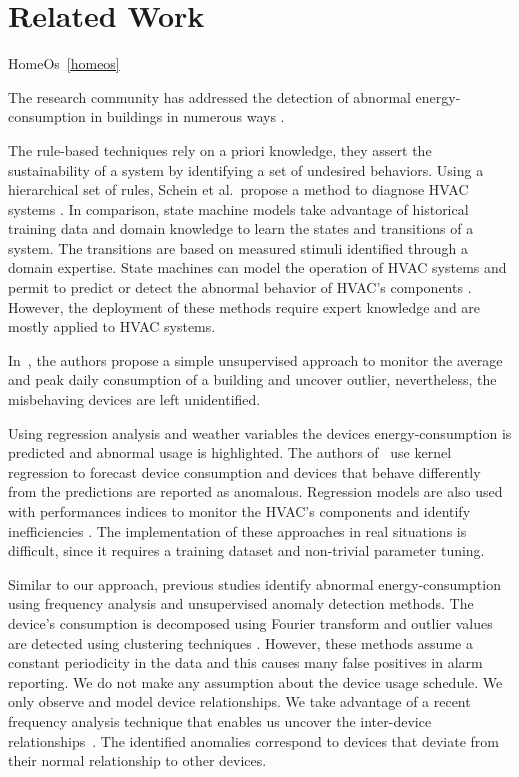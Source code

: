 \section{Related Work}
HomeOs~\ref{homeos}

The research community has addressed the detection of abnormal energy-consumption in buildings in numerous ways \cite{katipamula:1review2005,katipamula:2review2005}.
% 

The rule-based techniques rely on a priori knowledge, they assert the sustainability of a system by identifying a set of undesired behaviors.
Using a hierarchical set of rules, Schein et al.\ propose a method to diagnose HVAC systems \cite{schein:hvacr2006}.
In comparison, state machine models take advantage of historical training data and domain knowledge to learn the states and transitions of a system.
The transitions are based on measured stimuli identified through a domain expertise.
State machines can model the operation of HVAC systems \cite{patnaik:toist2011} and permit to predict or detect the abnormal behavior of HVAC's components \cite{bellala:buildsys2012}.
However, the deployment of these methods require expert knowledge and are mostly applied to HVAC systems.

In~\cite{seem:energybldg2007}, the authors propose a simple unsupervised approach to monitor the average and peak daily consumption of a building and uncover outlier, nevertheless, the misbehaving devices are left unidentified.

Using regression analysis and weather variables the devices energy-consumption is predicted and abnormal usage is highlighted.
The authors of~\cite{brown:buildperf2012} use kernel regression to forecast device consumption and devices that behave differently from the predictions are reported as anomalous.
Regression models are also used with performances indices to monitor the HVAC's components and identify inefficiencies \cite{zhou:wiley2009}.
The implementation of these approaches in real situations is difficult, since it requires a training dataset and non-trivial 
parameter tuning.

Similar to our approach, previous studies identify abnormal energy-consumption using frequency analysis and unsupervised anomaly detection methods.
The device's consumption is decomposed using Fourier transform and outlier values are detected using clustering 
techniques \cite{Bellala_buildsys11,wrinch:pes2012,chen:aaaiw2011}. %
However, these methods assume a constant periodicity in the data and this causes many false positives in alarm reporting.  %
We do not make any assumption about the device usage schedule.  We only observe and model device relationships.
We take advantage of a recent frequency analysis technique that enables us uncover the inter-device relationships~\cite{romain:iotapp12}.
The identified anomalies correspond to devices that deviate from their normal relationship to other devices.

